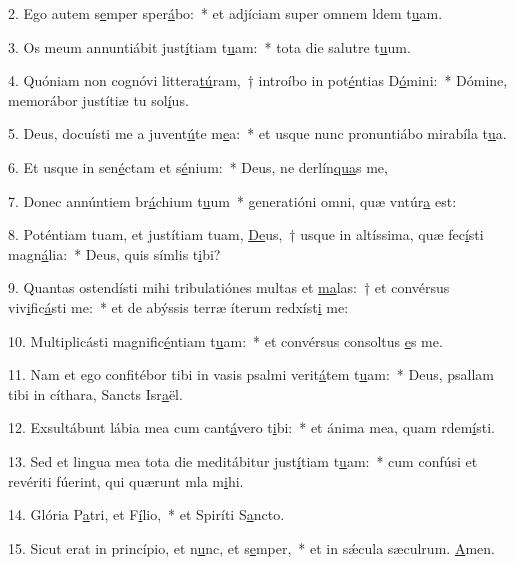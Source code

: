 2. Ego autem s\uline{e}mper sper\uline{á}bo:~* et adjíciam super omnem ldem t\uline{u}am.\par 
3. Os meum annuntiábit just\uline{í}tiam t\uline{u}am:~* tota die salutre t\uline{u}um.\par 
4. Quóniam non cognóvi littera\uline{tú}ram,~† introíbo in pot\uline{é}ntias D\uline{ó}mini:~* Dómine, memorábor justítiæ tu sol\uline{í}us.\par 
5. Deus, docuísti me a juvent\uline{ú}te m\uline{e}a:~* et usque nunc pronuntiábo mirabíla t\uline{u}a.\par 
6. Et usque in sen\uline{é}ctam et s\uline{é}nium:~* Deus, ne derlín\uline{qua}s me,\par 
7. Donec annúntiem br\uline{á}chium t\uline{u}um~* generatióni omni, quæ vntúr\uline{a} est:\par 
8. Poténtiam tuam, et justítiam tuam, \uline{De}us,~† usque in altíssima, quæ fec\uline{í}sti magn\uline{á}lia:~* Deus, quis símlis t\uline{i}bi?\par 
9. Quantas ostendísti mihi tribulatiónes multas et \uline{ma}las:~† et convérsus viv\uline{i}fic\uline{á}sti me:~* et de abýssis terræ íterum redxíst\uline{i} me:\par 
10. Multiplicásti magnific\uline{é}ntiam t\uline{u}am:~* et convérsus consoltus \uline{e}s me.\par 
11. Nam et ego confitébor tibi in vasis psalmi verit\uline{á}tem t\uline{u}am:~* Deus, psallam tibi in cíthara, Sancts Isr\uline{a}ël.\par 
12. Exsultábunt lábia mea cum cant\uline{á}vero t\uline{i}bi:~* et ánima mea, quam rdem\uline{í}sti.\par 
13. Sed et lingua mea tota die meditábitur just\uline{í}tiam t\uline{u}am:~* cum confúsi et revériti fúerint, qui quærunt mla m\uline{i}hi.\par 
14. Glória P\uline{a}tri, et F\uline{í}lio,~* et Spiríti S\uline{a}ncto.\par 
15. Sicut erat in princípio, et n\uline{u}nc, et s\uline{e}mper,~* et in sǽcula sæculrum. \uline{A}men.\par 
